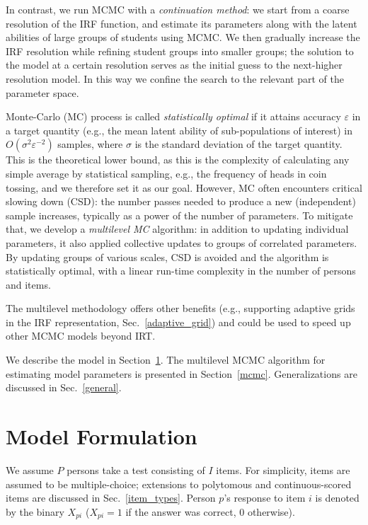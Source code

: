 \documentclass{article}
\begin{document}
In contrast, we run MCMC with a {\it continuation method}: we start from a coarse resolution of the IRF function, and estimate its parameters along with the latent abilities of large groups of students using MCMC. We then gradually increase the IRF resolution while refining student groups into smaller groups; the solution to the model at a certain resolution serves as the initial guess to the next-higher resolution model. In this way we confine the search to the relevant part of the parameter space.

Monte-Carlo (MC) process is called {\it statistically optimal} if it attains accuracy $\varepsilon$ in a target quantity (e.g., the mean latent ability of sub-populations of interest) in $O(\sigma^2 \varepsilon^{-2})$ samples, where $\sigma$ is the standard deviation of the target quantity. This is the theoretical lower bound, as this is the complexity of calculating any simple average by statistical sampling, e.g., the frequency of heads in coin tossing, and we therefore set it as our goal. However, MC often encounters critical slowing down (CSD): the number passes needed to produce a new (independent) sample increases, typically as a power of the number of parameters. To mitigate that, we develop a {\it multilevel MC} algorithm: in addition to updating individual parameters, it also applied collective updates to groups of correlated parameters. By updating groups of various scales, CSD is avoided and the algorithm is statistically optimal, with a linear run-time complexity in the number of persons and items. 

The multilevel methodology offers other benefits (e.g., supporting adaptive grids in the IRF representation, Sec.~\ref{adaptive_grid}) and could be used to speed up other MCMC models beyond IRT.

We describe the model in Section~\ref{model}. The multilevel MCMC algorithm for estimating model parameters is presented in Section~\ref{mcmc}. Generalizations are discussed in Sec.~\ref{general}.

\section{Model Formulation}
\label{model}
We assume $P$ persons take a test consisting of $I$ items. For simplicity, items are assumed to be multiple-choice; extensions to polytomous and continuous-scored items are discussed in Sec.~\ref{item_types}. Person $p$'s response to item $i$ is denoted by the binary $X_{pi}$ ($X_{pi}=1$ if the answer was correct, $0$ otherwise).
\end{document}

